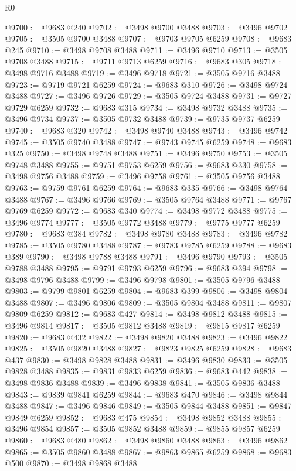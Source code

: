 \begin{lexlean}{R0}
\begin{coremodule}
@9700 := @9683 @240
@9702 := @3498 @9700 @3488
@9703 := @3496 @9702
@9705 := @3505 @9700 @3488
@9707 := @9703 @9705 @6259
@9708 := @9683 @245
@9710 := @3498 @9708 @3488
@9711 := @3496 @9710
@9713 := @3505 @9708 @3488
@9715 := @9711 @9713 @6259
@9716 := @9683 @305
@9718 := @3498 @9716 @3488
@9719 := @3496 @9718
@9721 := @3505 @9716 @3488
@9723 := @9719 @9721 @6259
@9724 := @9683 @310
@9726 := @3498 @9724 @3488
@9727 := @3496 @9726
@9729 := @3505 @9724 @3488
@9731 := @9727 @9729 @6259
@9732 := @9683 @315
@9734 := @3498 @9732 @3488
@9735 := @3496 @9734
@9737 := @3505 @9732 @3488
@9739 := @9735 @9737 @6259
@9740 := @9683 @320
@9742 := @3498 @9740 @3488
@9743 := @3496 @9742
@9745 := @3505 @9740 @3488
@9747 := @9743 @9745 @6259
@9748 := @9683 @325
@9750 := @3498 @9748 @3488
@9751 := @3496 @9750
@9753 := @3505 @9748 @3488
@9755 := @9751 @9753 @6259
@9756 := @9683 @330
@9758 := @3498 @9756 @3488
@9759 := @3496 @9758
@9761 := @3505 @9756 @3488
@9763 := @9759 @9761 @6259
@9764 := @9683 @335
@9766 := @3498 @9764 @3488
@9767 := @3496 @9766
@9769 := @3505 @9764 @3488
@9771 := @9767 @9769 @6259
@9772 := @9683 @340
@9774 := @3498 @9772 @3488
@9775 := @3496 @9774
@9777 := @3505 @9772 @3488
@9779 := @9775 @9777 @6259
@9780 := @9683 @384
@9782 := @3498 @9780 @3488
@9783 := @3496 @9782
@9785 := @3505 @9780 @3488
@9787 := @9783 @9785 @6259
@9788 := @9683 @389
@9790 := @3498 @9788 @3488
@9791 := @3496 @9790
@9793 := @3505 @9788 @3488
@9795 := @9791 @9793 @6259
@9796 := @9683 @394
@9798 := @3498 @9796 @3488
@9799 := @3496 @9798
@9801 := @3505 @9796 @3488
@9803 := @9799 @9801 @6259
@9804 := @9683 @399
@9806 := @3498 @9804 @3488
@9807 := @3496 @9806
@9809 := @3505 @9804 @3488
@9811 := @9807 @9809 @6259
@9812 := @9683 @427
@9814 := @3498 @9812 @3488
@9815 := @3496 @9814
@9817 := @3505 @9812 @3488
@9819 := @9815 @9817 @6259
@9820 := @9683 @432
@9822 := @3498 @9820 @3488
@9823 := @3496 @9822
@9825 := @3505 @9820 @3488
@9827 := @9823 @9825 @6259
@9828 := @9683 @437
@9830 := @3498 @9828 @3488
@9831 := @3496 @9830
@9833 := @3505 @9828 @3488
@9835 := @9831 @9833 @6259
@9836 := @9683 @442
@9838 := @3498 @9836 @3488
@9839 := @3496 @9838
@9841 := @3505 @9836 @3488
@9843 := @9839 @9841 @6259
@9844 := @9683 @470
@9846 := @3498 @9844 @3488
@9847 := @3496 @9846
@9849 := @3505 @9844 @3488
@9851 := @9847 @9849 @6259
@9852 := @9683 @475
@9854 := @3498 @9852 @3488
@9855 := @3496 @9854
@9857 := @3505 @9852 @3488
@9859 := @9855 @9857 @6259
@9860 := @9683 @480
@9862 := @3498 @9860 @3488
@9863 := @3496 @9862
@9865 := @3505 @9860 @3488
@9867 := @9863 @9865 @6259
@9868 := @9683 @500
@9870 := @3498 @9868 @3488

\end{coremodule}
\end{lexlean}
